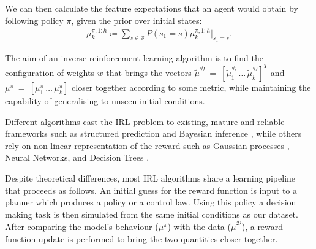 \documentclass[letterpaper]{article}
\begin{document}
We can then calculate the feature expectations that an agent would obtain by following policy $\pi$, given the prior over initial states:
\begin{align}
  \label{eq:feature_expectation_belief}
  \mu^{\pi,1:h}_k \coloneqq \sum_{s\in\mathcal{S}}P(s_1 = s)\mu^{\pi,1:h}_k|_{s_1=s}.
\end{align}

The aim of an inverse reinforcement learning algorithm is to find the configuration of weights $w$ that brings the vectors $\widetilde\mu^{\mathcal{D}}~=~[\widetilde\mu^{\mathcal{D}}_1\,\ldots\,\widetilde\mu^{\mathcal{D}}_k]^T$ and $\mu^{\pi}~=~[\mu^{\pi}_1\,\ldots\,\mu^{\pi}_k]$ closer together according to some metric, while maintaining the capability of generalising to unseen initial conditions.

Different algorithms cast the IRL problem to existing, mature and reliable frameworks such as structured prediction \cite{ratliff2006maximum} and Bayesian inference \cite{ramachandran2007bayesian}, while others rely on non-linear representation of the reward such as Gaussian processes \cite{levine2011nonlinear}, Neural Networks, and Decision Trees \cite{ratliff2007boosting}. 

Despite theoretical differences, most IRL algorithms share a learning pipeline that proceeds as follows. An initial guess for the reward function is input to a planner which produces a policy or a control law. Using this policy a decision making task is then simulated from the same initial conditions as our dataset. After comparing the model's behaviour ($\mu^{\pi}$)  with the data ($\widetilde{\mu}^{\mathcal{D}}$), a reward function update is performed to bring the two quantities closer together.
\end{document}
